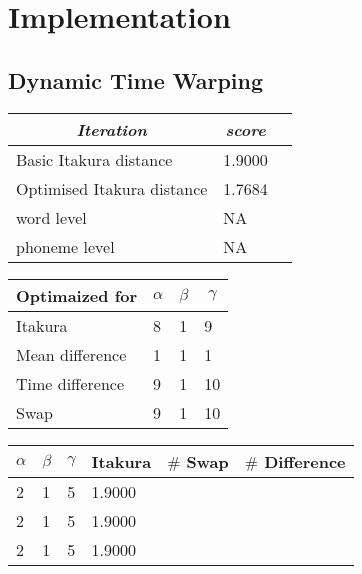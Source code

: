 \chapter{Implementation} %
\label{cha:implementation}

\section{Dynamic Time Warping} %
\label{imp:dynamic_time_warping}

\begin{table}[htbp]
	\begin{center}
		\begin{tabular}{lll}
			\toprule
			\multicolumn{1}{c}{\emph{Iteration}} & \multicolumn{1}{c}{\emph{score}} \\
			\midrule
			Basic Itakura distance & 1.9000 \\
			Optimised Itakura distance & 1.7684 \\
			word level & NA \\
			phoneme level & NA \\
			\bottomrule			
		\end{tabular}		
	\end{center}
\label{tab:dtw_accuracy}	
\end{table}

\begin{table}[htbp]
	\begin{center}
		\begin{tabular}{llll}
			\toprule
			\multicolumn{1}{c}{Optimaized for} & \multicolumn{1}{c}{$\alpha$} & \multicolumn{1}{c}{$\beta$} & \multicolumn{1}{c}{$\gamma$} \\
			\midrule
			Itakura & 8 & 1 & 9 \\
			Mean difference & 1 & 1 & 1 \\
			Time difference & 9 & 1 & 10 \\
			Swap & 9 & 1 & 10 \\			
			\bottomrule			
		\end{tabular}		
	\end{center}
\label{tab:local_constraints}	
\end{table}

\begin{table}[htbp]
	\begin{center}
		\begin{tabular}{llllll}
			\toprule
			\multicolumn{1}{c}{$\alpha$} & \multicolumn{1}{c}{$\beta$} & \multicolumn{1}{c}{$\gamma$} & \multicolumn{1}{c}{Itakura}  & \multicolumn{1}{c}{$\#$ Swap} & \multicolumn{1}{c}{$\#$ Difference}\\
			\midrule
			2 & 1 & 5 & 1.9000 & & \\
			2 & 1 & 5 & 1.9000 & & \\
			2 & 1 & 5 & 1.9000 & & \\			
			\bottomrule			
		\end{tabular}		
	\end{center}
\label{tab:local_constraints_II}	
\end{table}
